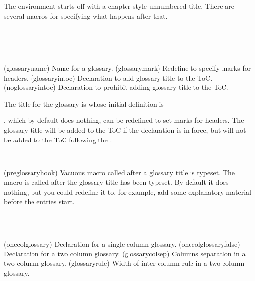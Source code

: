     The environment starts off with a chapter-style unnumbered title.
There are several macros for specifying what happens after that.

\begin{syntax}
\cmd{\glossaryname} \\
\cmd{\glossarymark} \\
\cmd{\glossaryintoc} \cmd{\noglossaryintoc} \\
\end{syntax}
\glossary(glossaryname)%
  {}%
  {Name for a glossary.}%
\glossary(glossarymark)%
  {}%
  {Redefine to specify marks for headers.}%
\glossary(glossaryintoc)%
  {}%
  {Declaration to add glossary title to the ToC.}%
\glossary(noglossaryintoc)%
  {}%
  {Declaration to prohibit adding glossary title to the ToC.}%

The title for the glossary is \cmd{\glossaryname} whose initial definition
is 
\begin{lcode}
\newcommand*{\glossaryname}{Glossary}
\end{lcode}
\cmd{\glossarymark}, which by default does nothing, can be redefined to
set marks for headers. The glossary title will be added to the ToC
if the \cmd{\glossaryintoc} declaration is in force, but will not be
added to the ToC following the \cmd{\noglossaryintoc}.

\begin{syntax}
\cmd{\preglossaryhook} \\
\end{syntax}
\glossary(preglossaryhook)%
  {}%
  {Vacuous macro called after a glossary title is typeset.}
The macro \cmd{\preglossaryhook} is called after the glossary title 
has been typeset. By default it does nothing, but you could redefine
it to, for example, add some explanatory material before the entries
start.

\begin{syntax}
\cmd{\onecolglossary} \cmd{\twocolglossary} \\
\lnc{\glossarycolsep} \lnc{\glossaryrule} \\
\end{syntax}
\glossary(onecolglossary)%
  {}%
  {Declaration for a single column glossary.}%
\glossary(onecolglossaryfalse)%
  {}%
  {Declaration for a two column glossary.}%
\glossary(glossarycolsep)%
  {}%
  {Columns separation in a two column glossary.}%
\glossary(glossaryrule)%
  {}%
  {Width of inter-column rule in a two column glossary.}%

